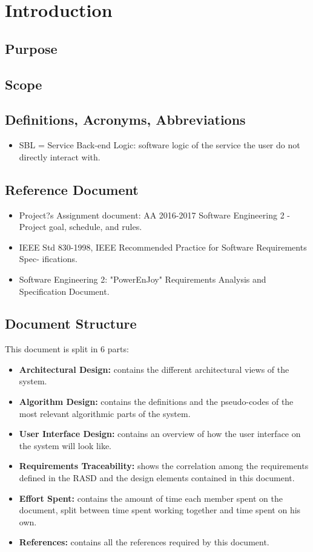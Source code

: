 \section{Introduction}
\subsection{Purpose}

\subsection{Scope}

\subsection{Definitions, Acronyms, Abbreviations}
\begin{itemize}
    \item  SBL = Service Back-end Logic: software logic of the service the user do not directly interact with.
\end{itemize}

\subsection{Reference Document}
\begin{itemize}
    \item Project?s Assignment document: AA 2016-2017 Software Engineering 2 - Project goal, schedule, and rules.
    \item IEEE Std 830-1998, IEEE Recommended Practice for Software Requirements Spec- ifications.
    \item Software Engineering 2: "PowerEnJoy" Requirements Analysis and Specification Document.
\end{itemize}

\subsection{Document Structure}
This document is split in 6 parts:
\begin{itemize}
    \item \textbf{Architectural Design:} contains the different architectural views of the system.
    \item \textbf{Algorithm Design:} contains the definitions and the pseudo-codes of the most relevant algorithmic parts of the system.
    \item \textbf{User Interface Design:} contains an overview of how the user interface on the system will look like.
    \item \textbf{Requirements Traceability:} shows the correlation among the requirements defined in the RASD and the design elements contained in this document.
    \item \textbf{Effort Spent:} contains the amount of time each member spent on the document, split between time spent working together and time spent on his own.
    \item \textbf{References:} contains all the references required by this document.
\end{itemize}
